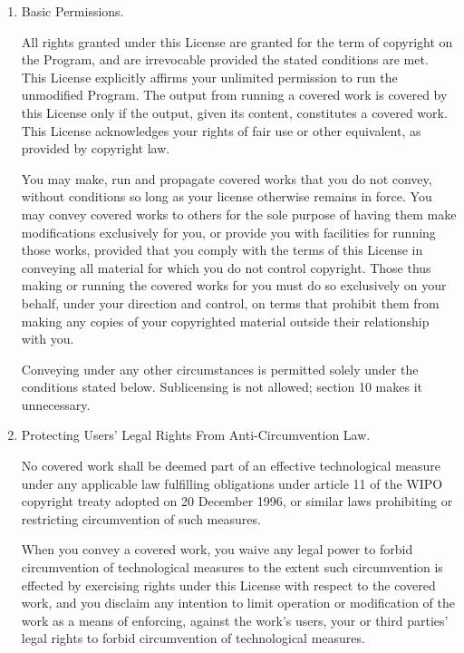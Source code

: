 \documentclass[10pt,a4paper,ngerman,titlepage,tocindentauto]{article}
\begin{document}
\begin{multicols}{3}
{\begin{enumerate}
					The Corresponding Source need not include anything that users
					can regenerate automatically from other parts of the Corresponding
					Source.

					The Corresponding Source for a work in source code form is that
					same work.

					\item Basic Permissions.

					All rights granted under this License are granted for the term of
					copyright on the Program, and are irrevocable provided the stated
					conditions are met.  This License explicitly affirms your unlimited
					permission to run the unmodified Program.  The output from running a
					covered work is covered by this License only if the output, given its
					content, constitutes a covered work.  This License acknowledges your
					rights of fair use or other equivalent, as provided by copyright law.

					You may make, run and propagate covered works that you do not
					convey, without conditions so long as your license otherwise remains
					in force.  You may convey covered works to others for the sole purpose
					of having them make modifications exclusively for you, or provide you
					with facilities for running those works, provided that you comply with
					the terms of this License in conveying all material for which you do
					not control copyright.  Those thus making or running the covered works
					for you must do so exclusively on your behalf, under your direction
					and control, on terms that prohibit them from making any copies of
					your copyrighted material outside their relationship with you.

					Conveying under any other circumstances is permitted solely under
					the conditions stated below.  Sublicensing is not allowed; section 10
					makes it unnecessary.

					\item Protecting Users' Legal Rights From Anti-Circumvention Law.

					No covered work shall be deemed part of an effective technological
					measure under any applicable law fulfilling obligations under article
					11 of the WIPO copyright treaty adopted on 20 December 1996, or
					similar laws prohibiting or restricting circumvention of such
					measures.

					When you convey a covered work, you waive any legal power to forbid
					circumvention of technological measures to the extent such circumvention
					is effected by exercising rights under this License with respect to
					the covered work, and you disclaim any intention to limit operation or
					modification of the work as a means of enforcing, against the work's
					users, your or third parties' legal rights to forbid circumvention of
					technological measures.


\end{enumerate}}
\end{multicols}
\end{document}
